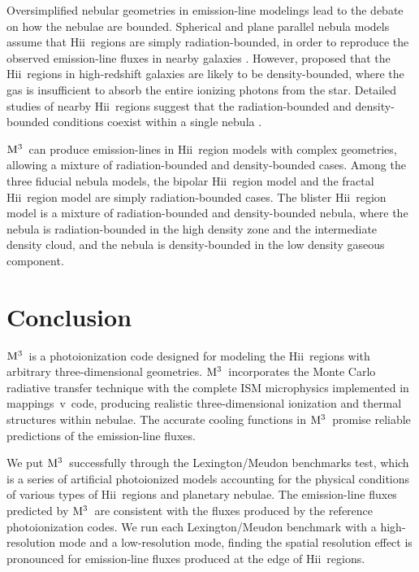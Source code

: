 \documentclass[twocolumn]{aastex62}
\newcommand{\newcode}{{$\rm M^3$}}
\newcommand{\mappings}{{\sc mappings~v}}
\newcommand{\hiireg}{{H{\sc ii}}}
\begin{document}
\begin{CJK*}{UTF8}{gbsn}
Oversimplified nebular geometries in emission-line modelings lead to the debate on how the nebulae are bounded.
Spherical and plane parallel nebula models assume that \hiireg\ regions are simply radiation-bounded, in order to reproduce the observed emission-line fluxes in nearby galaxies \citep{Kewley-2001}.
However, \cite{Nakajima-2013} proposed that the \hiireg\ regions in high-redshift galaxies are likely to be density-bounded, where the gas is insufficient to absorb the entire ionizing photons from the star.
Detailed studies of nearby \hiireg\ regions suggest that the radiation-bounded and density-bounded conditions coexist within a single nebula \citep{Pellegrini-2012}.

\newcode\ can produce emission-lines in \hiireg\ region models with complex geometries, allowing a mixture of radiation-bounded and density-bounded cases.
Among the three fiducial nebula models, the bipolar \hiireg\ region model and the fractal \hiireg\ region model are simply radiation-bounded cases.
The blister \hiireg\ region model is a mixture of radiation-bounded and density-bounded nebula, where the nebula is radiation-bounded in the high density zone and the intermediate density cloud, and the nebula is density-bounded in the low density gaseous component. 



\section{Conclusion}\label{sec:summary}

\newcode\ is a photoionization code designed for modeling the \hiireg\ regions with arbitrary three-dimensional geometries.
\newcode\ incorporates the Monte Carlo radiative transfer technique with the complete ISM microphysics implemented in \mappings\ code, producing realistic three-dimensional ionization and thermal structures within nebulae.
The accurate cooling functions in \newcode\ promise reliable predictions of the emission-line fluxes.

We put \newcode\ successfully through the Lexington/Meudon benchmarks test, which is a series of artificial photoionized models accounting for the physical conditions of various types of \hiireg\ regions and planetary nebulae.
The emission-line fluxes predicted by \newcode\ are consistent with the fluxes produced by the reference photoionization codes.
We run each Lexington/Meudon benchmark with a high-resolution mode and a low-resolution mode, finding the spatial resolution effect is pronounced for emission-line fluxes produced at the edge of \hiireg\ regions.


\end{CJK*}
\end{document}

